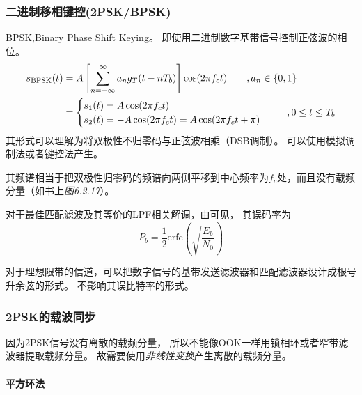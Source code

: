     \subsubsection{二进制移相键控(2PSK/BPSK)}
    BPSK,Binary Phase Shift Keying。
    即使用二进制数字基带信号控制正弦波的相位。   
    \begin{equation}
        \begin{split}
            s_{\text{BPSK}}(t)   &=A\left[\sum_{n=-\infty}^{\infty}a_ng_T(t-nT_b)\right]\cos(2\pi f_c t)\hspace{2em},a_n\in\{0,1\}\\
                                &=\begin{cases}
                                    s_1(t)=A\cos(2\pi f_ct)\\
                                    s_2(t)=-A\cos(2\pi f_ct)=A\cos(2\pi f_ct+\pi)
                                \end{cases}\hspace{1.5em},0\leq t\leq T_b
        \end{split}
    \end{equation}
    其形式可以理解为将双极性不归零码与正弦波相乘（DSB调制）。
    可以使用模拟调制法或者键控法产生。

    其频谱相当于把双极性归零码的频谱向两侧平移到中心频率为$f_c$处，而且没有载频分量（如书上\emph{图6.2.17}）。

    对于最佳匹配滤波及其等价的LPF相关解调，由可见，
    其误码率为
    \begin{equation}
        P_b=\frac{1}{2}\text{erfc}\left(\sqrt{\frac{E_b}{N_0}}\right)
    \end{equation}

    对于理想限带的信道，可以把数字信号的基带发送滤波器和匹配滤波器设计成根号升余弦的形式。
    不影响其误比特率的形式。

    \subsubsection{2PSK的载波同步}
    
    因为2PSK信号没有离散的载频分量，
    所以不能像OOK一样用锁相环或者窄带滤波器提取载频分量。
    故需要使用\emph{非线性变换}产生离散的载频分量。

    \paragraph{平方环法}\mbox{}
    
